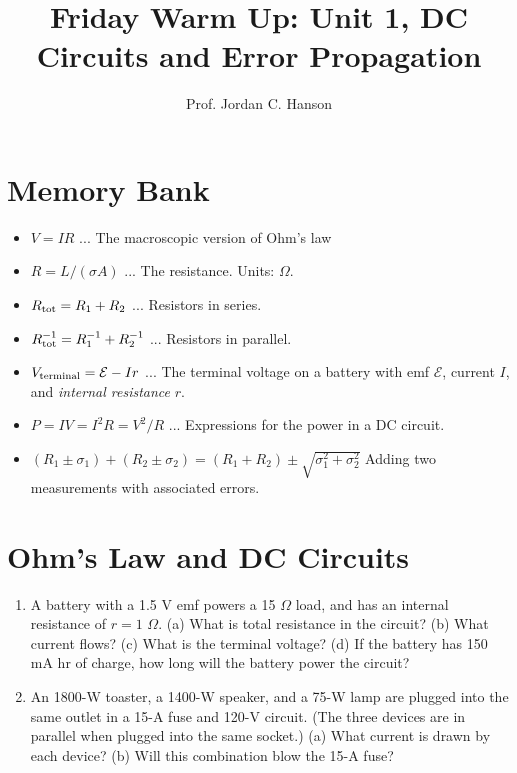 \documentclass{article}
\begin{document}
\twocolumn

\title{Friday Warm Up: Unit 1, DC Circuits and Error Propagation}
\author{Prof. Jordan C. Hanson}

\maketitle

\section{Memory Bank}

\begin{itemize}
\item $V = IR$ ... The macroscopic version of Ohm's law
\item $R = L/(\sigma A)$ ... The resistance.  Units: $\Omega$.
\item $R_{\rm tot} = R_1 + R_2$ ... Resistors in series.
\item $R_{\rm tot}^{-1} = R_1^{-1} + R_2^{-1}$ ... Resistors in parallel.
\item $V_{\rm terminal} = \mathcal{E} - Ir$ ... The terminal voltage on a battery with emf $\mathcal{E}$, current $I$, and \textit{internal resistance} $r$.
\item $P = IV = I^2 R = V^2/R$ ... Expressions for the power in a DC circuit.
\item $(R_1 \pm \sigma_1) + (R_2 \pm \sigma_2) = (R_1 + R_2) \pm \sqrt{\sigma_1^2 + \sigma_2^2}$ Adding two measurements with associated errors.
\end{itemize}

\section{Ohm's Law and DC Circuits}

\begin{enumerate}
\item A battery with a 1.5 V emf powers a 15 $\Omega$ load, and has an internal resistance of $r = 1$ $\Omega$.  (a) What is total resistance in the circuit? (b) What current flows? (c) What is the terminal voltage? (d) If the battery has 150 mA hr of charge, how long will the battery power the circuit? \\ \vspace{5cm}
\item An 1800-W toaster, a 1400-W speaker, and a 75-W lamp are plugged into the same outlet in a 15-A fuse and 120-V circuit. (The three devices are in parallel when plugged into the same socket.) (a) What current is drawn by each device? (b) Will this combination blow the 15-A fuse? \\ \vspace{5cm}
\end{enumerate}
\end{document}
